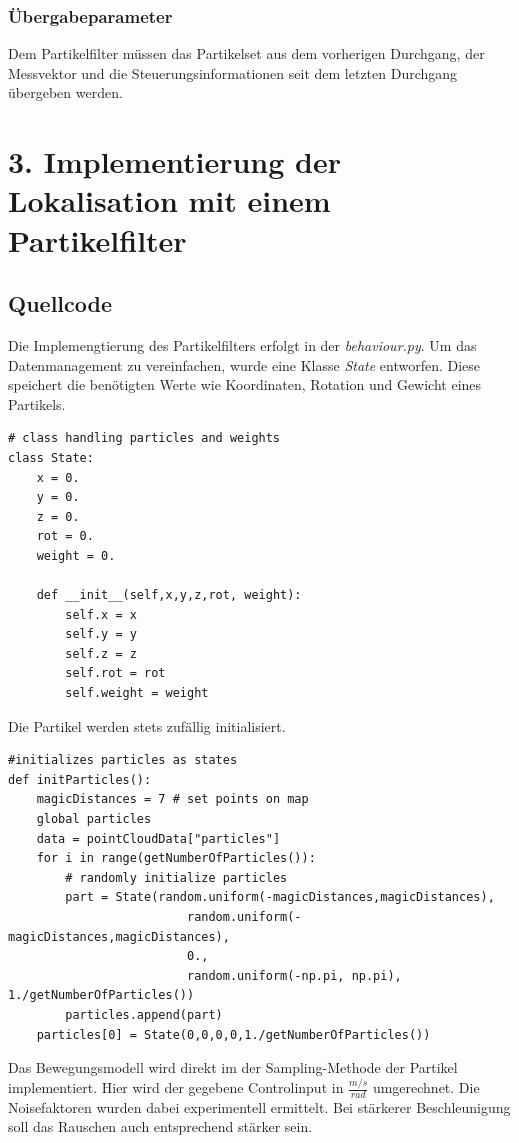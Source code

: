 \documentclass{../Vorlage/mat}
\begin{document}
\subsubsection*{Übergabeparameter}
Dem Partikelfilter müssen das Partikelset aus dem vorherigen Durchgang, der Messvektor und die Steuerungsinformationen seit dem letzten Durchgang übergeben werden.\\

\section*{3. Implementierung der Lokalisation mit einem Partikelfilter}
\subsection*{Quellcode}
\lstset{language=python}
Die Implemengtierung des Partikelfilters erfolgt in der \textit{behaviour.py}. Um das Datenmanagement zu vereinfachen, wurde eine Klasse \textit{State} entworfen. Diese speichert die benötigten Werte wie Koordinaten, Rotation und Gewicht eines Partikels.
\begin{lstlisting}
# class handling particles and weights
class State:
    x = 0.
    y = 0.
    z = 0.
    rot = 0.
    weight = 0.

    def __init__(self,x,y,z,rot, weight):
        self.x = x
        self.y = y
        self.z = z
        self.rot = rot
        self.weight = weight
\end{lstlisting}

Die Partikel werden stets zufällig initialisiert.

\begin{lstlisting}
#initializes particles as states
def initParticles():
    magicDistances = 7 # set points on map
    global particles
    data = pointCloudData["particles"]
    for i in range(getNumberOfParticles()):
        # randomly initialize particles
        part = State(random.uniform(-magicDistances,magicDistances),
                         random.uniform(-magicDistances,magicDistances),
                         0., 
                         random.uniform(-np.pi, np.pi), 1./getNumberOfParticles())
        particles.append(part)
    particles[0] = State(0,0,0,0,1./getNumberOfParticles())
\end{lstlisting}

Das Bewegungsmodell wird direkt im der Sampling-Methode der Partikel implementiert. Hier wird der gegebene Controlinput in $\frac{m / s}{rad}$ umgerechnet. Die Noisefaktoren wurden dabei experimentell ermittelt. Bei stärkerer Beschleunigung soll das Rauschen auch entsprechend stärker sein.
\end{document}
